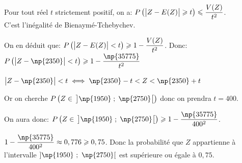\begin{enumerate}
Pour tout réel $t$  strictement positif, on a:
$P\left ( \left | Z-E(Z)\strut \right | \geqslant t\right ) \leqslant \dfrac{V(Z)}{t^2}$.\\
C'est l'inégalité de Bienaymé-Tchebychev.

On en déduit que: 	$P\left ( \left | Z-E(Z)\strut \right | < t\right ) \geqslant 1- \dfrac{V(Z)}{t^2}$. Donc:
$P\left ( \left | Z- \np{2350}\strut \right | < t\right ) \geqslant 1- \dfrac{\np{35775}}{t^2}$

$\left | Z- \np{2350}\strut \right | < t
\iff \np{2350}-t < Z < \np{2350}+ t$

Or on cherche $P\left ( Z \in\, \left ] \np{1950}\;;\; \np{2750}\strut \right [\right )$ donc on prendra $t=400$.

On aura donc:
$P\left ( Z \in\, \left ] \np{1950}\;;\; \np{2750}\strut \right [\right )
\geqslant 1- \dfrac{\np{35775}}{400^2}$.

$1- \dfrac{\np{35775}}{400^2} \approx 0,776 \geqslant 0,75$.
Donc la probabilité que $Z$ appartienne à l'intervalle $]\np{1950}~;~\np{2750}[$ 
 est supérieure ou égale à $0,75$.
\end{enumerate}


\bigskip
